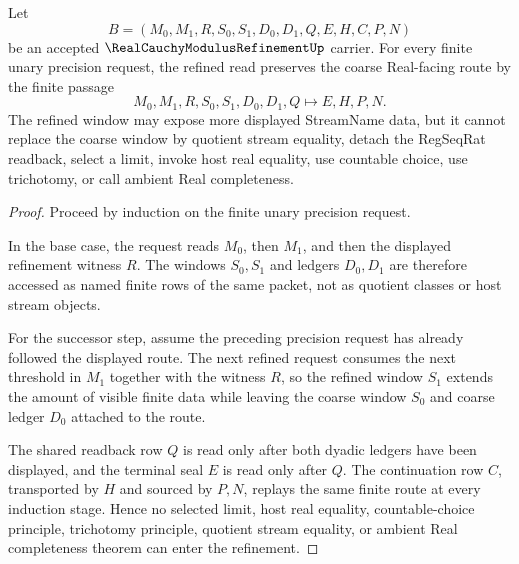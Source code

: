 \begin{theorem}
\label{thm:real-cauchy-modulus-refinement-window-refinement}
Let
$$
B=(M_0,M_1,R,S_0,S_1,D_0,D_1,Q,E,H,C,P,N)
$$
be an accepted $\RealCauchyModulusRefinementUp$ carrier. For every finite unary precision request, the refined read preserves the coarse Real-facing route by the finite passage
$$
M_0,M_1,R,S_0,S_1,D_0,D_1,Q \longmapsto E,H,P,N .
$$
The refined window may expose more displayed StreamName data, but it cannot replace the coarse window by quotient stream equality, detach the RegSeqRat readback, select a limit, invoke host real equality, use countable choice, use trichotomy, or call ambient Real completeness.
\end{theorem}
\begin{proof}
Proceed by induction on the finite unary precision request.

In the base case, the request reads $M_0$, then $M_1$, and then the displayed refinement witness $R$. The windows $S_0,S_1$ and ledgers $D_0,D_1$ are therefore accessed as named finite rows of the same packet, not as quotient classes or host stream objects.

For the successor step, assume the preceding precision request has already followed the displayed route. The next refined request consumes the next threshold in $M_1$ together with the witness $R$, so the refined window $S_1$ extends the amount of visible finite data while leaving the coarse window $S_0$ and coarse ledger $D_0$ attached to the route.

The shared readback row $Q$ is read only after both dyadic ledgers have been displayed, and the terminal seal $E$ is read only after $Q$. The continuation row $C$, transported by $H$ and sourced by $P,N$, replays the same finite route at every induction stage. Hence no selected limit, host real equality, countable-choice principle, trichotomy principle, quotient stream equality, or ambient Real completeness theorem can enter the refinement.
\end{proof}


